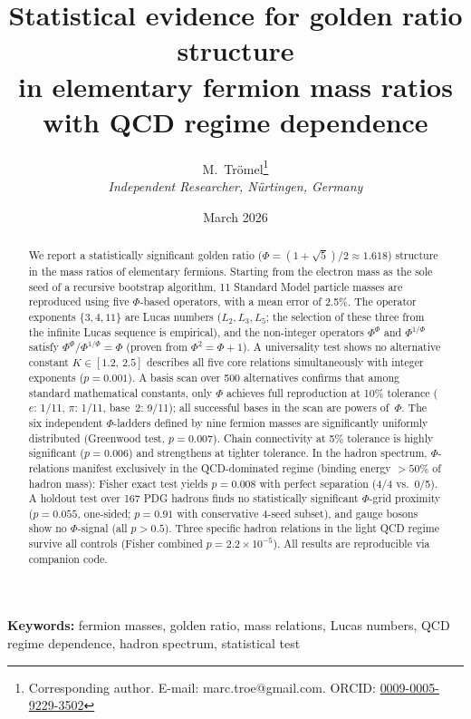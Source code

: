 \documentclass[11pt,a4paper]{article}
\title{%
  Statistical evidence for golden ratio structure\\
  in elementary fermion mass ratios\\
  with QCD regime dependence%
}
\author{%
  M.\ Tr\"omel\thanks{Corresponding author. E-mail: marc.troe@gmail.com.
  ORCID: \href{https://orcid.org/0009-0005-9229-3502}{0009-0005-9229-3502}}\\[4pt]
  \textit{Independent Researcher, N\"urtingen, Germany}
}
\date{March 2026}
\begin{document}
\maketitle

\begin{abstract}
We report a statistically significant golden ratio
($\Phi = (1{+}\sqrt{5})/2 \approx 1.618$) structure in the mass ratios
of elementary fermions. Starting from the electron mass as the sole seed
of a recursive bootstrap algorithm, 11 Standard Model particle
masses are reproduced using five $\Phi$-based operators, with a mean error of 2.5\%.
The operator exponents $\{3, 4, 11\}$ are Lucas numbers ($L_2, L_3, L_5$;
the selection of these three from the infinite Lucas sequence is empirical),
and the non-integer operators $\Phi^\Phi$ and $\Phi^{1/\Phi}$ satisfy
$\Phi^\Phi / \Phi^{1/\Phi} = \Phi$ (proven from $\Phi^2 = \Phi + 1$).
A universality test shows no alternative constant
$K \in [1.2,\, 2.5]$ describes all five core relations simultaneously
with integer exponents ($p = 0.001$). A basis scan over 500 alternatives confirms that
among standard mathematical constants, only $\Phi$ achieves full
reproduction at 10\% tolerance ($e$: 1/11, $\pi$: 1/11, base~2: 9/11);
all successful bases in the scan are powers of~$\Phi$.
The six independent $\Phi$-ladders
defined by nine fermion masses are significantly uniformly distributed
(Greenwood test, $p = 0.007$). Chain connectivity at 5\% tolerance is
highly significant ($p = 0.006$) and strengthens at tighter tolerance.
In the hadron spectrum, $\Phi$-relations manifest exclusively in the
QCD-dominated regime (binding energy $> 50\%$ of hadron mass): Fisher
exact test yields $p = 0.008$ with perfect separation (4/4 vs.\ 0/5).
A holdout test over 167 PDG hadrons finds no statistically significant
$\Phi$-grid proximity ($p = 0.055$, one-sided; $p = 0.91$ with conservative
4-seed subset), and gauge bosons show no $\Phi$-signal (all $p > 0.5$).
Three specific hadron relations in the light QCD regime survive all
controls (Fisher combined $p = 2.2 \times 10^{-5}$). All results are reproducible
via companion code.
\end{abstract}

\noindent\textbf{Keywords:}
fermion masses, golden ratio, mass relations, Lucas numbers,
QCD regime dependence, hadron spectrum, statistical test

\end{document}
